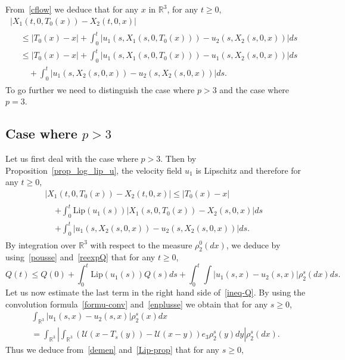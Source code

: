 \documentclass[AHL,Unicode,longabstracts,published]{cedram}
\newcommand{\Lip}{\mathrm{Lip}}
\newcommand{\R}{\mathbb{R}}
\newcommand{\clU}{\mathcal{U}}
\renewcommand{\leq}{\leqslant}
\renewcommand{\geq}{\geqslant}
\begin{document}
From~\eqref{cflow} we deduce that for any $x$ in $\R^3$, for any $t\geq 0$,
\begin{multline}\label{esti-arep}
| X_1(t,0,T_0 (x)) -X_2(t,0,x)| \\
\begin{aligned}
&\leq |T_0 (x)- x| + \int_0^t \big|u_1(s,{X}_1(s,0,T_0 (x))) -u_2(s,{X}_2(s,0,x))\big| ds\\ 
 & \leq |T_0 (x)- x| + \int_0^t \big|u_1(s,{X}_1(s,0,T_0 (x))) -u_1(s,{X}_2(s,0,x))\big| ds\\ 
& \quad + \int_0^t \big|u_1(s,{X}_2(s,0,x)) -u_2(s,{X}_2(s,0,x))\big| ds.
\end{aligned}
\end{multline}
To go further we need to distinguish the case where $p> 3$ and the case where $p=3$.
\subsection{Case where \texorpdfstring{$p> 3$}{p>3}} Let us first deal with the case where $p> 3$. Then by Proposition~\ref{prop_log_lip_u}, the velocity field $u_1$ is Lipschitz and therefore for any $t\geq 0$,
\begin{multline*}
\big| X_1(t,0,T_0 (x)) -X_2(t,0,x)\big|  \leq |T_0 (x)- x|\\
\begin{aligned}
&+ \int_0^t \Lip(u_1(s)) \big|{X}_1(s,0,T_0 (x)) -{X}_2(s,0,x)\big| ds\\
&+ \int_0^t \big|u_1(s,{X}_2(s,0,x)) -u_2(s,{X}_2(s,0,x))\big| ds.
\end{aligned}
\end{multline*}
By integration over $\R^3$ with respect to the measure $\rho_2^0(dx)$, we deduce by using~\eqref{pousse} and~\eqref{reexpQ} that for any $t\geq 0$,
\begin{equation}\label{ineq-Q}
Q(t) \leq Q(0) + \int_0^t \Lip(u_1(s)) Q(s) ds+ \int_0^t \int |u_1(s,x) -u_2(s,x)| \rho_2^s(dx) ds.
\end{equation}
Let us now estimate the last term in the right hand side of~\eqref{ineq-Q}. By using the convolution formula~\eqref{formu-conv} and~\eqref{enplusse} we obtain that for any $s\geq 0$,
\begin{multline}\label{demen}
\int_{\R^3} |u_1(s,x)-u_2(s,x)| \rho^s_2(x)dx  \\ =\int_{\R^3} \left| \int_{\R^3}(\clU(x-T_s (y)) - \clU(x-y))e_3\rho_2^s(y)dy \right| \rho_2^s(dx).
\end{multline}
Thus we deduce from~\eqref{demen} and~\eqref{Lip-prop} that for any $s\geq 0$,
\end{document}
